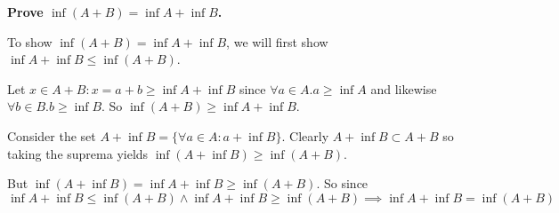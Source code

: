 \documentclass[10pt,a4paper]{article}
\begin{document}
\begin{enumerate}
        \textbf{Prove $\inf(A+B) = \inf A + \inf B $.}

        To show $\inf(A+B) = \inf A + \inf B $, we will first show $\inf A + \inf B \leq \inf(A+B)$.

        Let $x \in A+B : x =a+b  \geq \inf A  + \inf B$ since $\forall a \in A. a \geq \inf A$ and likewise $\forall b \in B. b \geq \inf B$.  So $\inf (A+B) \geq \inf A +  \inf B$.

        Consider the set $A+\inf B = \{\forall a \in A: a+\inf B\}$. Clearly $A + \inf B \subset A+B $ so taking the suprema yields $\inf(A+\inf B)\geq \inf(A+B)$. 

        But $\inf(A + \inf B) = \inf A + \inf B \geq \inf(A+B)$. So since 
        $$\inf A + \inf B \leq \inf(A+B) \land \inf A + \inf B \geq \inf(A+B) \implies \inf A + \inf B = \inf(A+B)$$





\end{enumerate}
\end{document}
